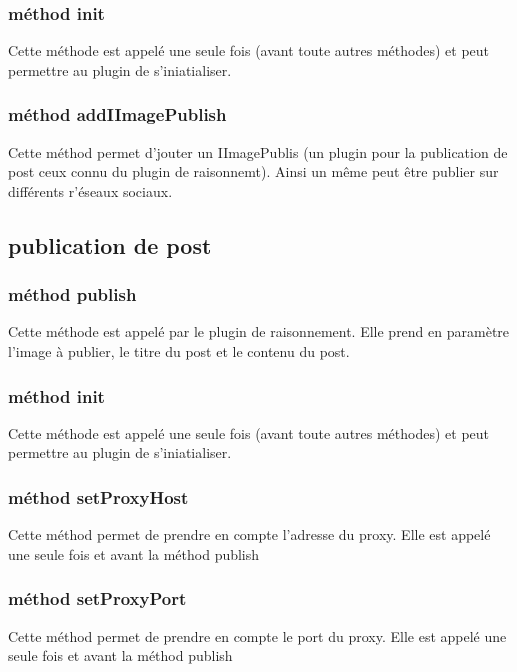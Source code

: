 \documentclass[a4paper , 12pt]{article}
\begin{document}
  \subsubsection*{méthod init}
  Cette méthode est appelé une seule fois (avant toute autres méthodes) et peut permettre au plugin de s'iniatialiser.
  \subsubsection*{méthod addIImagePublish}
  Cette méthod permet d'jouter un IImagePublis (un plugin pour la publication de post  ceux connu du plugin de raisonnemt). Ainsi un même peut être publier sur différents r'éseaux sociaux.

  \subsection{publication de post}
  
  \subsubsection*{méthod publish}
  Cette méthode est appelé par le plugin de raisonnement. Elle prend en paramètre l'image à publier, le titre du post et le contenu du post.
  \subsubsection*{méthod init}
  Cette méthode est appelé une seule fois (avant toute autres méthodes) et peut permettre au plugin de s'iniatialiser.
  \subsubsection*{méthod setProxyHost}
  Cette méthod permet de prendre en compte l'adresse du proxy. Elle est appelé une seule fois et avant la méthod publish
  \subsubsection*{méthod setProxyPort}
  Cette méthod permet de prendre en compte le port du proxy. Elle est appelé une seule fois et avant la méthod publish
\end{document}

